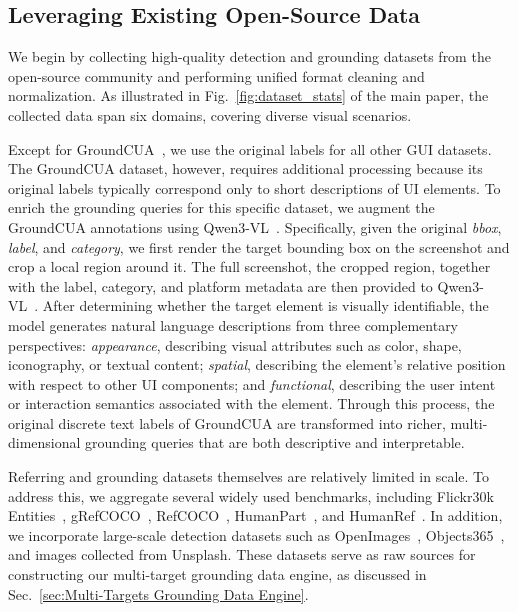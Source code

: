 \subsection{Leveraging Existing Open-Source Data}
We begin by collecting high-quality detection and grounding datasets from the open-source community and performing unified format cleaning and normalization. As illustrated in Fig.~\ref{fig:dataset_stats} of the main paper, the collected data span six domains, covering diverse visual scenarios.

Except for GroundCUA~\citep{feizi2025grounding}, we use the original labels for all other GUI datasets. The GroundCUA dataset, however, requires additional processing because its original labels typically correspond only to short descriptions of UI elements. To enrich the grounding queries for this specific dataset, we augment the GroundCUA annotations using Qwen3-VL~\citep{bai2025qwen3vltechnicalreport}. Specifically, given the original \textit{bbox}, \textit{label}, and \textit{category}, we first render the target bounding box on the screenshot and crop a local region around it. The full screenshot, the cropped region, together with the label, category, and platform metadata are then provided to Qwen3-VL~\citep{bai2025qwen3vltechnicalreport}. After determining whether the target element is visually identifiable, the model generates natural language descriptions from three complementary perspectives: \textit{appearance}, describing visual attributes such as color, shape, iconography, or textual content; \textit{spatial}, describing the element's relative position with respect to other UI components; and \textit{functional}, describing the user intent or interaction semantics associated with the element. Through this process, the original discrete text labels of GroundCUA are transformed into richer, multi-dimensional grounding queries that are both descriptive and interpretable.

Referring and grounding datasets themselves are relatively limited in scale. To address this, we aggregate several widely used benchmarks, including Flickr30k Entities~\citep{plummer2016flickr30kentitiescollectingregiontophrase}, gRefCOCO~\citep{he2023grecgeneralizedreferringexpression}, RefCOCO~\citep{yu2016modelingcontextreferringexpressions}, HumanPart~\citep{yu2016modelingcontextreferringexpressions}, and HumanRef~\citep{jiang2025rexomni}. In addition, we incorporate large-scale detection datasets such as OpenImages~\citep{kuznetsova2020open}, Objects365~\citep{Shao_2019_ICCV}, and images collected from Unsplash. These datasets serve as raw sources for constructing our multi-target grounding data engine, as discussed in Sec.~\ref{sec:Multi-Targets Grounding Data Engine}.

